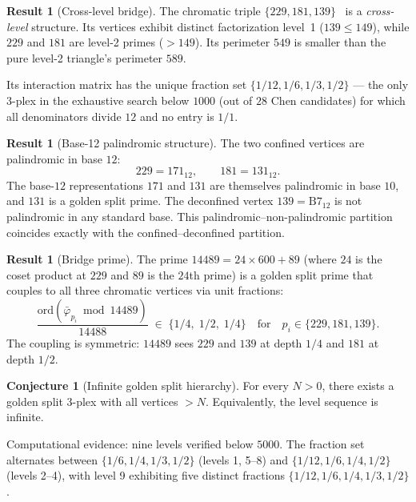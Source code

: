 \documentclass[12pt,oneside]{article}
\theoremstyle{principia}
\theoremstyle{definition}
\newtheorem{result}[theorem]{Result}
\newtheorem{conjecture}[theorem]{Conjecture}
\theoremstyle{remark}
\begin{document}
\begin{result}[Cross-level bridge]
\label{res:crosslevel}
The chromatic triple $\{229, 181, 139\}$~\cite{larue_chromatic} is a \emph{cross-level}
structure. Its vertices exhibit distinct factorization level~1 ($139 \leq 149$),
while $229$ and $181$ are level-2 primes ($> 149$). Its perimeter
$549$ is smaller than the pure level-2 triangle's perimeter $589$.

Its interaction matrix has the unique fraction set
$\{1/12, 1/6, 1/3, 1/2\}$ --- the only $3$-plex in the
exhaustive search below $1000$ (out of $28$ Chen candidates)
for which all denominators divide $12$ and no entry is $1/1$.
\end{result}

\begin{result}[Base-12 palindromic structure]
\label{res:palindrome}
The two confined vertices are palindromic in base $12$:
\[
229 = 171_{12}, \qquad 181 = 131_{12}.
\]
The base-$12$ representations $171$ and $131$ are themselves
palindromic in base $10$, and $131$ is a golden split prime.
The deconfined vertex $139 = \mathrm{B7}_{12}$ is not palindromic
in any standard base. This palindromic--non-palindromic partition
coincides exactly with the confined--deconfined partition.
\end{result}

\begin{result}[Bridge prime]
\label{res:bridge}
The prime $14489 = 24 \times 600 + 89$
(where $24$ is the coset product at $229$ and $89$ is the $24$th
prime) is a golden split prime that couples to all three chromatic
vertices via unit fractions:
\[
\frac{\mathrm{ord}(\bar\varphi_{p_i} \bmod 14489)}{14488}
\;\in\; \{1/4,\; 1/2,\; 1/4\}
\quad\text{for}\quad p_i \in \{229, 181, 139\}.
\]
The coupling is symmetric: $14489$ sees $229$ and $139$ at depth
$1/4$ and $181$ at depth $1/2$.
\end{result}

\begin{conjecture}[Infinite golden split hierarchy]
\label{conj:hierarchy}
For every $N > 0$, there exists a golden split $3$-plex with all
vertices $> N$. Equivalently, the level sequence is infinite.
\end{conjecture}

Computational evidence: nine levels verified below $5000$.
The fraction set alternates between
$\{1/6, 1/4, 1/3, 1/2\}$ (levels 1, 5--8) and
$\{1/12, 1/6, 1/4, 1/2\}$ (levels 2--4), with level 9 exhibiting
five distinct fractions $\{1/12, 1/6, 1/4, 1/3, 1/2\}$.
\end{document}
